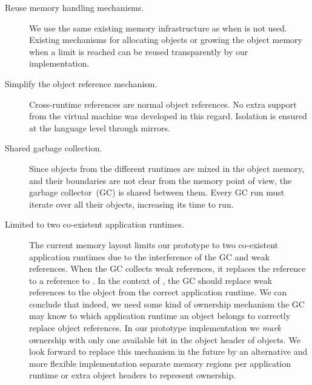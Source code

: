 \begin{description}
	\item[Reuse memory handling mechanisms.] We use the same existing memory infrastructure as when \Vtt is not used. Existing mechanisms for allocating objects or growing the object memory when a limit is reached can be reused transparently by our implementation. 
	\item[Simplify the object reference mechanism.] Cross-runtime references are normal object references. No extra support from the virtual machine was developed in this regard. Isolation is ensured at the language level through mirrors.
	\item[Shared garbage collection.] Since objects from the different runtimes are mixed in the object memory, and their boundaries are not clear from the memory point of view, the garbage collector~(GC) is shared between them. Every GC run must iterate over all their objects, increasing its time to run.
	\item[Limited to two co-existent application runtimes.] The current memory layout limits our prototype to two co-existent application runtimes due to the interference of the GC and weak references. When the GC collects weak references, it replaces the reference to a reference to . In the context of \Vtt, the GC should replace weak references to the  object from the correct application runtime. We can conclude that indeed, we need some kind of ownership mechanism \ie the GC may know to which application runtime an object belongs to correctly replace object references. In our prototype implementation we \emph{mark} ownership with only one available bit in the object header of objects. We look forward to replace this mechanism in the future by an alternative and more flexible implementation \eg separate memory regions per application runtime or extra object headers to represent ownership.
\end{description}



